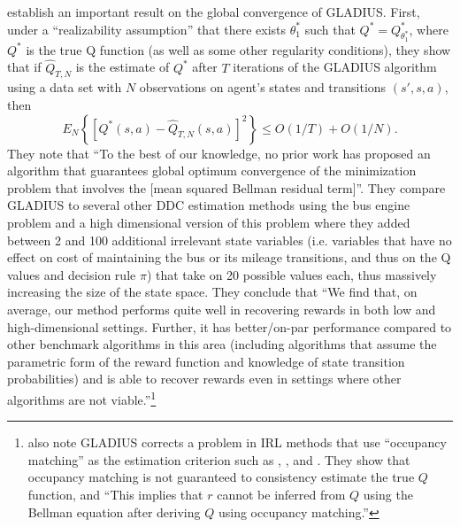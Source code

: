 \citet{kang:2025} establish an important result on the global convergence of GLADIUS. First, under a ``realizability assumption''
that there exists $\theta_1^*$ such that $Q^*=Q_{\theta_1^*}^*$, where $Q^*$ is the true Q function
(as well as some other regularity conditions), they show that 
if $\hat Q_{T,N}$ is the estimate of $Q^*$ after $T$ iterations of the GLADIUS algorithm using a data set with $N$ observations
on agent's states and transitions $(s',s,a)$, then
\begin{equation}
     E_N\left\{[Q^*(s,a)-\hat Q_{T,N}(s,a)]^2\right\} \le O(1/T) + O(1/N).
\end{equation}
They note that ``To the best of our knowledge,  
no prior work has proposed an algorithm that guarantees global optimum convergence of the minimization problem that involves
the [mean squared Bellman residual term]''. They compare GLADIUS to several other DDC estimation methods using the
\citet{rust:1987} bus engine problem and a high dimensional version of this problem where they added between
2 and 100 additional irrelevant
state variables (i.e. variables that have no effect on cost of maintaining the bus or its mileage
transitions, and thus on the Q values and decision rule $\pi$) that take on 20 possible values each, thus 
massively increasing the size of the state space. They conclude that
``We find that, on average, our method performs quite well in recovering rewards in both low and high-dimensional settings. Further, it has better/on-par performance compared to other benchmark algorithms in this area (including algorithms that assume the parametric form of the reward function and knowledge of state transition probabilities) and is able to recover rewards even in settings where other algorithms are not viable.''\footnote{\footnotesize
\citet{kang:2025} also note GLADIUS corrects a problem in IRL methods that use ``occupancy matching'' as the estimation criterion
such as \citet{hoermon:2016}, \citet{iqlearn:2022}, and \citet{clare:2023}. They show that occupancy matching is not guaranteed
to consistency estimate the true $Q$ function, and ``This implies that $r$ cannot be inferred from $Q$ 
using the Bellman equation after deriving $Q$ using occupancy matching.''}


